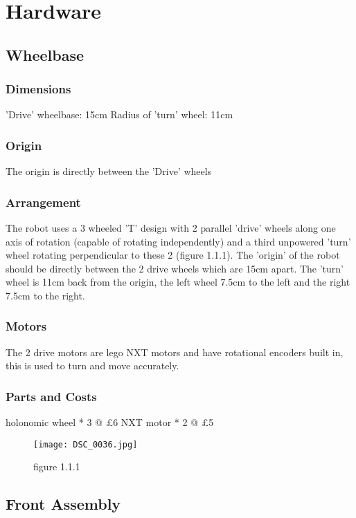 \section{Hardware}

\subsection{Wheelbase}
\subsubsection{Dimensions}
'Drive' wheelbase:		15cm \newline
Radius of 'turn' wheel: 11cm
\subsubsection{Origin}
The origin is directly between the 'Drive' wheels
\subsubsection{Arrangement}
The robot uses a 3 wheeled 'T' design with 2 parallel 'drive' wheels along one axis of rotation (capable of rotating independently) and a third unpowered 'turn' wheel rotating perpendicular to these 2 (figure 1.1.1). The 'origin' of the robot should be 
directly between the 2 drive wheels which are 15cm apart. The 'turn' wheel 
is 11cm back from the origin, the left wheel 7.5cm to the left and the right
7.5cm to the right. 

\subsubsection{Motors}
The 2 drive motors are lego NXT motors and have rotational encoders built in, this is used to turn and move accurately. 

\subsubsection{Parts and Costs}
holonomic wheel * 3 @ £6 \newline
NXT motor       * 2 @ £5 \newline

\begin{figure}[!ht]
\caption{figure 1.1.1}
\centering
\texttt{[image: DSC\_0036.jpg]}
\end{figure}

\subsection{Front Assembly}
